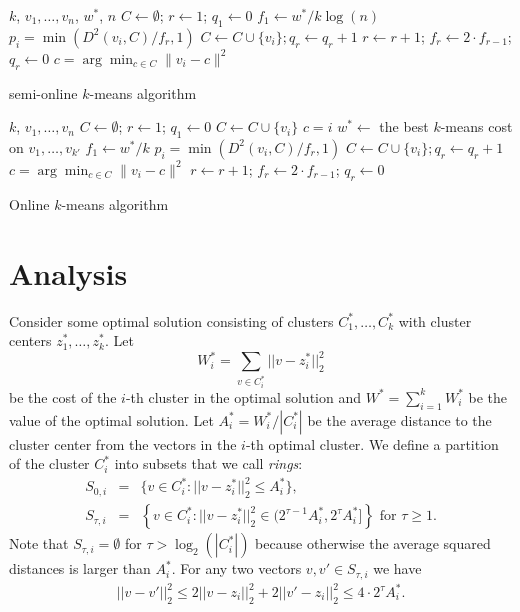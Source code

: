 \documentclass{article}
\def\tab{\hspace{5mm}}
\begin{document}
\begin{algorithm}
\begin{algorithmic}
 $k$, $v_1,\ldots,v_n$, $w^*$, $n$
\STATE $C \gets \emptyset$;\;\; $r \gets 1$;\;\; $q_1 \gets 0$ 
\STATE $f_1 \gets w^*/k\log(n)$
	 $p_i = \min(D^2(v_i, C)/f_r,1)$
	\STATE \tab $C \gets C \cup \{v_i\}; q_r\gets q_r+1$
		\STATE $r \gets r+1$;\;\;  $f_r \gets 2\cdot f_{r-1}$;\;\; $q_r \gets 0$
	\ENDIF
	 $c = \arg\min_{c \in C}\|v_i - c\|^2$
\ENDFOR
\caption{semi-online $k$-means algorithm}\label{alg3}
\end{algorithmic}
\end{algorithm}

\begin{algorithm}
\begin{algorithmic}
 $k$, $v_1,\ldots,v_n$
\STATE $C \gets \emptyset$;\;\; $r \gets 1$;\;\; $q_1 \gets 0$ 
	\STATE $C \gets C \cup \{v_i\}$
	 $c = i$
\ENDFOR
\STATE $w^{*} \gets$ the best $k$-means cost on $v_1,\ldots,v_{k'}$
\STATE $f_1 \gets  w^{*}/k$
	 $p_i = \min(D^2(v_i, C)/f_r,1)$
	\STATE \tab $C \gets C \cup \{v_i\}; q_r\gets q_r+1$
	 $c = \arg\min_{c \in C}\|v_i - c\|^2$
		\STATE $r \gets r+1$;\;\;  $f_r \gets 2\cdot f_{r-1}$;\;\; $q_r \gets 0$
	\ENDIF
\ENDFOR
\caption{Online $k$-means algorithm}\label{alg1}
\end{algorithmic}
\end{algorithm}

 



\section{Analysis}\label{analysis}
Consider some optimal solution consisting of clusters $C_1^*,\dots,C^*_k$ with cluster centers $z_1^*,\dots,z^*_k$. Let
$$W^*_i=\sum_{v\in C^*_i} ||v-z_i^*||_2^2$$
be the cost of the $i$-th cluster in the optimal solution and 
 $W^*=\sum_{i=1}^kW^*_i$ be the value of the optimal solution. 
Let $A^*_i=W^*_i/|C^*_i|$ be the average distance to the cluster center from the vectors in the $i$-th optimal cluster. 
We define a partition of the cluster $C_i^*$ into subsets that we call {\it rings}: 
\begin{eqnarray}
S_{0,i}&=&\{v\in C^*_i: ||v-z^*_i||^2_2\le A^*_i\},\\
S_{\tau,i}&=&\left\{v\in C^*_i: ||v-z^*_i||^2_2\in ( 2^{\tau-1}A^*_i,2^{\tau}A^*_i]\right\} \mbox{ for }\tau\ge 1.
\end{eqnarray}
Note that $S_{\tau,i}=\emptyset $  for $\tau > \log_2 (|C_i^*|)$ because otherwise the average squared distances is larger than $A^*_i$.
For any two vectors $v,v'\in S_{\tau,i}$  we have 
\begin{eqnarray}\label{triangleInequality}
||v-v'||^2_2\le 2 ||v-z_i||^2_2+2||v'-z_i||^2_2\le 4\cdot 2^{\tau}A^*_i.
\end{eqnarray}
\end{document}
